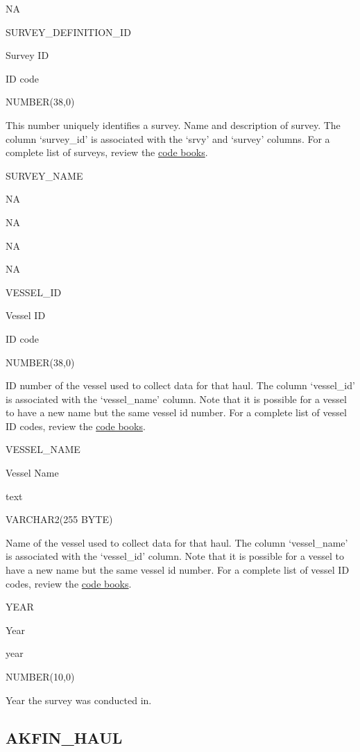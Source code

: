 \documentclass[
  letterpaper,
  oneside,
  open=any]{scrbook}
\begin{document}
NA

SURVEY\_DEFINITION\_ID

Survey ID

ID code

NUMBER(38,0)

This number uniquely identifies a survey. Name and description of
survey. The column `survey\_id' is associated with the `srvy' and
`survey' columns. For a complete list of surveys, review the
\href{https://www.fisheries.noaa.gov/resource/document/groundfish-survey-species-code-manual-and-data-codes-manual}{code
books}.

SURVEY\_NAME

NA

NA

NA

NA

VESSEL\_ID

Vessel ID

ID code

NUMBER(38,0)

ID number of the vessel used to collect data for that haul. The column
`vessel\_id' is associated with the `vessel\_name' column. Note that it
is possible for a vessel to have a new name but the same vessel id
number. For a complete list of vessel ID codes, review the
\href{https://www.fisheries.noaa.gov/resource/document/groundfish-survey-species-code-manual-and-data-codes-manual}{code
books}.

VESSEL\_NAME

Vessel Name

text

VARCHAR2(255 BYTE)

Name of the vessel used to collect data for that haul. The column
`vessel\_name' is associated with the `vessel\_id' column. Note that it
is possible for a vessel to have a new name but the same vessel id
number. For a complete list of vessel ID codes, review the
\href{https://www.fisheries.noaa.gov/resource/document/groundfish-survey-species-code-manual-and-data-codes-manual}{code
books}.

YEAR

Year

year

NUMBER(10,0)

Year the survey was conducted in.

\hypertarget{akfin_haul}{%
\subsection{AKFIN\_HAUL}\label{akfin_haul}}
\end{document}

